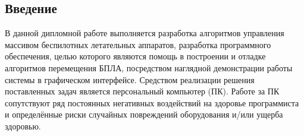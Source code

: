 \subsection{Введение}

В данной дипломной работе выполняется разработка алгоритмов управления
массивом беспилотных летательных аппаратов, разработка программного обеспечения, 
целью которого являются помощь в построении и отладке алгоритмов
перемещения БПЛА, посредством наглядной демонстрации работы системы в графическом
интерфейсе. Средством реализации решения поставленных задач является персональный компьютер (ПК).
Работе за ПК сопутствуют ряд постоянных негативных воздействий на здоровье программиста и
определённые риски случайных повреждений оборудования и/или ущерба здоровью.
